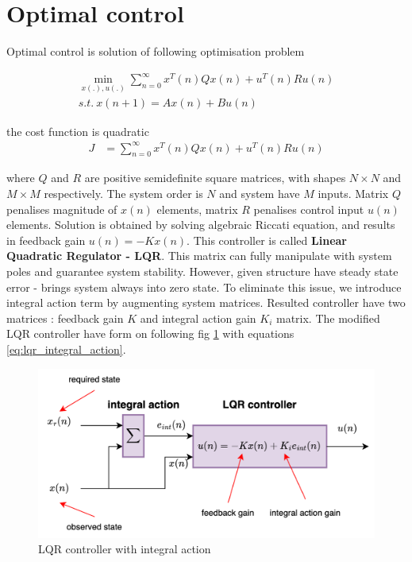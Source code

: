 \documentclass[12pt,twoside,onecolumn,openany,extrafontsizes,dvipsnames]{memoir}
\begin{document}
    \newpage
    \section{Optimal control}
       
        Optimal control is solution of following optimisation problem

        \begin{align}
            \min_{x(.), u(.)} \sum_{n=0}^\infty x^T(n)Qx(n) + u^T(n)Ru(n) \\
            s.t.\ x(n+1) = Ax(n) + Bu(n)
        \end{align}

        the cost function is quadratic
        \begin{align}
            J &= \sum_{n=0}^\infty x^T(n)Qx(n) + u^T(n)Ru(n)
        \end{align}

        where $Q$ and $R$ are positive semidefinite square matrices, with shapes $N \times N$ and $M \times M$ respectively.
        The system order is $N$ and system have $M$ inputs.
        Matrix $Q$ penalises magnitude of $x(n)$ elements, matrix $R$ penalises control input $u(n)$ elements.
        Solution is obtained by solving algebraic Riccati equation, and results in feedback gain $u(n) = -Kx(n)$.
        This controller is called \textbf{Linear Quadratic Regulator - LQR}.
        This matrix can fully manipulate with system poles and guarantee system stability.
        However, given structure have steady state error - brings system always into zero state.
        To eliminate this issue, we introduce integral action term by augmenting system matrices. 
        Resulted controller have two matrices : feedback gain $K$ and integral action gain $K_i$ matrix.
        The modified LQR controller have form on following fig \ref{fig:control_lqr_generic} 
        with equations \ref{eq:lqr_integral_action}.

        \begin{figure}[!htb]
            \centering
            \includegraphics[scale=0.8]{../diagrams/control_generic/control_generic-lqr_discrete.png}
            \caption{LQR controller with integral action}
            \label{fig:control_lqr_generic}
        \end{figure}
\end{document}
